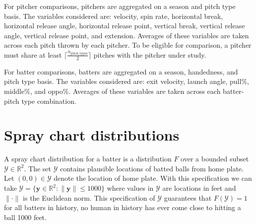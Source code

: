 \documentclass[11pt]{article}
\newcommand{\R}{\mathbb{R}}
\newcommand{\Y}{\mathcal{Y}}
\newcommand{\y}{\textbf{y}}
\begin{document}
For pitcher comparisons, pitchers are aggregated on a season and pitch type basis. The variables considered are: velocity, spin rate, horizontal break, horizontal release angle, horizontal release point, vertical break, vertical release angle, vertical release point, and extension. Averages of these variables are taken across each pitch thrown by each pitcher.
To be eligible for comparison, a pitcher must share at least  $\lceil \frac{n_{\text{pitch\_types}}}{2} \rceil$ pitches with the pitcher under study.

For batter comparisons, batters are aggregated on a season, handedness, and pitch type basis. The variables considered are: exit velocity, launch angle, pull\%, middle\%, and oppo\%. Averages of these variables are taken across each batter-pitch type combination.


\section{Spray chart distributions}

A spray chart distribution for a batter is a distribution $F$ over a bounded subset $\Y \in \R^2$. The set $\Y$ contains plausible locations of batted balls from home plate. Let $(0,0) \in \Y$ denote the location of home plate. With this specification we can take $\Y = \{\y \in \R^2: \|\y\| \leq 1000\}$ where values in $\Y$ are locations in feet and $\|\cdot\|$ is the Euclidean norm. This specification of $\Y$ guarantees that $F(\Y) = 1$ for all batters in history, no human in history has ever come close to hitting a ball 1000 feet.
\end{document}
